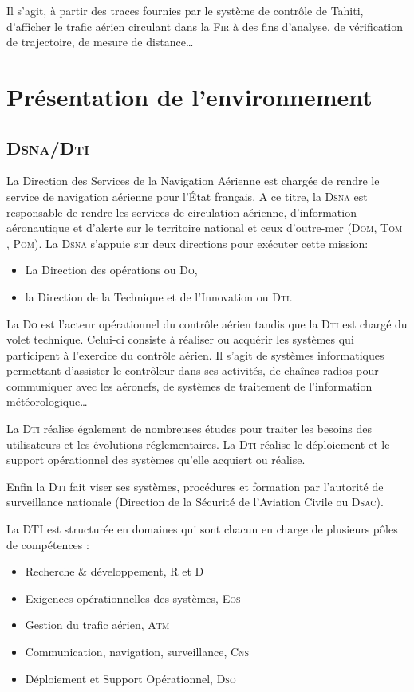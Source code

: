 Il s’agit, à partir des traces fournies par le système de contrôle de Tahiti, d’afficher le trafic aérien circulant dans la \textsc{Fir} à des fins d’analyse, de vérification de trajectoire, de mesure de distance…

    
\section{Présentation de l’environnement}
    \subsection{\textsc{Dsna/Dti}}
La Direction des Services de la Navigation Aérienne est chargée de rendre le service de navigation aérienne pour l’État français. A ce titre, la \textsc{Dsna} est responsable de rendre les services de circulation aérienne, d’information aéronautique et d’alerte sur le territoire national et ceux d’outre-mer (\textsc{Dom, Tom , Pom}). La \textsc{Dsna} s’appuie sur deux directions pour exécuter cette mission:
\begin{itemize}
    \item La Direction des opérations ou \textsc{Do},
    \item la Direction de la Technique et de l’Innovation ou \textsc{Dti}.
\end{itemize}\medskip
La \textsc{Do} est l’acteur opérationnel du contrôle aérien tandis que la \textsc{Dti} est chargé du volet technique. Celui-ci consiste à réaliser ou acquérir les systèmes qui participent à l’exercice du contrôle aérien. Il s’agit de systèmes informatiques permettant d’assister le contrôleur dans ses activités, de chaînes radios pour communiquer avec les aéronefs, de systèmes de traitement de l’information météorologique…

La \textsc{Dti} réalise également de nombreuses études pour traiter les besoins des utilisateurs et les évolutions réglementaires. La \textsc{Dti} réalise le déploiement et le support opérationnel des systèmes qu’elle acquiert ou réalise. 

Enfin la \textsc{Dti} fait viser ses systèmes, procédures et formation par l’autorité de surveillance nationale (Direction de la Sécurité de l'Aviation Civile ou \textsc{Dsac}).

La DTI est structurée en domaines qui sont chacun en charge de plusieurs pôles de compétences :
\begin{itemize}
    \item Recherche \& développement, R et D
    \item Exigences opérationnelles des systèmes, \textsc{Eos}
    \item Gestion du trafic aérien, \textsc{Atm}
    \item Communication, navigation, surveillance, \textsc{Cns}
    \item Déploiement et Support Opérationnel, \textsc{Dso}
\end{itemize}\medskip

